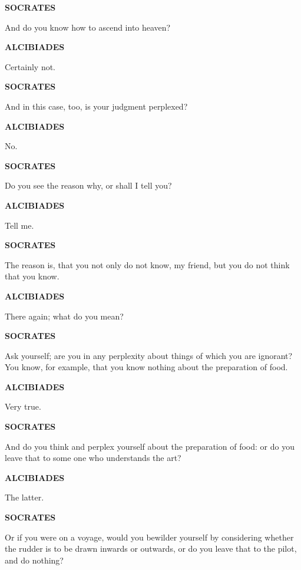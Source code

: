 \documentclass[11pt,letter]{article}
\begin{document}
\par \textbf{SOCRATES}
\par   And do you know how to ascend into heaven?

\par \textbf{ALCIBIADES}
\par   Certainly not.

\par \textbf{SOCRATES}
\par   And in this case, too, is your judgment perplexed?

\par \textbf{ALCIBIADES}
\par   No.

\par \textbf{SOCRATES}
\par   Do you see the reason why, or shall I tell you?

\par \textbf{ALCIBIADES}
\par   Tell me.

\par \textbf{SOCRATES}
\par   The reason is, that you not only do not know, my friend, but you do not think that you know.

\par \textbf{ALCIBIADES}
\par   There again; what do you mean?

\par \textbf{SOCRATES}
\par   Ask yourself; are you in any perplexity about things of which you are ignorant? You know, for example, that you know nothing about the preparation of food.

\par \textbf{ALCIBIADES}
\par   Very true.

\par \textbf{SOCRATES}
\par   And do you think and perplex yourself about the preparation of food:  or do you leave that to some one who understands the art?

\par \textbf{ALCIBIADES}
\par   The latter.

\par \textbf{SOCRATES}
\par   Or if you were on a voyage, would you bewilder yourself by considering whether the rudder is to be drawn inwards or outwards, or do you leave that to the pilot, and do nothing?
\end{document}
